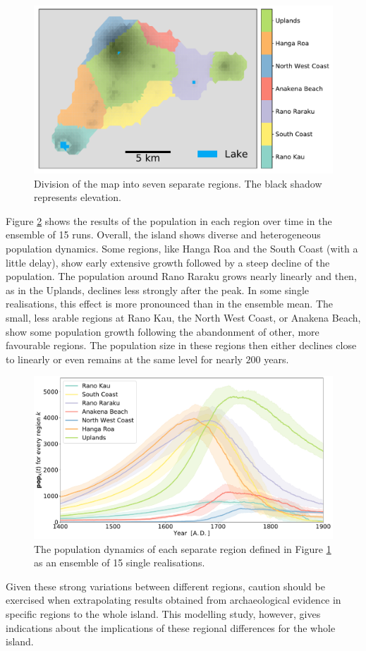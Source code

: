 \begin{figure}
	\centering
	\includegraphics[width=1.0\linewidth]{images/Results/Standard/MapRegionsCoarse}
	\caption{Division of the map into seven separate regions. The black shadow represents elevation.}
	\label{fig:mapregionscoarse}
\end{figure}
Figure \ref{fig:regionalstats} shows the results of the population in each region over time in the ensemble of 15 runs.
Overall, the island shows diverse and heterogeneous population dynamics. 
Some regions, like Hanga Roa and the South Coast (with a little delay), show early extensive growth followed by a steep decline of the population.
The population around Rano Raraku grows nearly linearly and then, as in the Uplands, declines less strongly after the peak.
In some single realisations, this effect is more pronounced than in the ensemble mean.
The small, less arable regions at Rano Kau, the North West Coast, or Anakena Beach, show some population growth following the abandonment of other, more favourable regions.
The population size in these regions then either declines close to linearly or even remains at the same level for nearly $200$ years.
\begin{figure}
	\centering
	\includegraphics[width=1.0\linewidth]{images/Results/Standard/RegionalStatsEnsembleOnly}
	\caption{The population dynamics of each separate region defined in Figure \ref{fig:mapregionscoarse} as an ensemble of 15 single realisations.}
	\label{fig:regionalstats}
\end{figure}
Given these strong variations between different regions, caution should be exercised when extrapolating results obtained from archaeological evidence in specific regions to the whole island. 
This modelling study, however, gives indications about the implications of these regional differences for the whole island.

